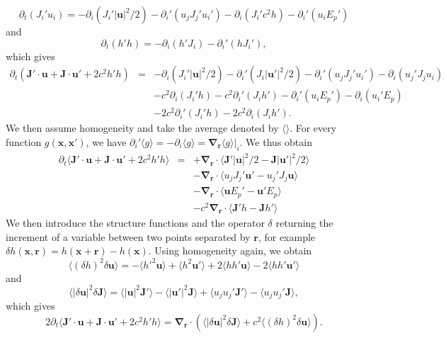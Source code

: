 \documentclass{jfm}
\providecommand\bnabla{\boldsymbol{\nabla}}
\newcommand\p{\ensuremath{\partial}}
\newcommand{\uu}{\textbf{u}}
\newcommand{\xx}{\textbf{x}}
\newcommand{\JJ}{\textbf{J}}
\newcommand{\rr}{\textbf{r}}
\newcommand{\meane}[1]{\langle #1 \rangle}
\begin{document}
\begin{equation}
\p_t ( J_i' u_i ) = - \p_i( J_i'|\uu|^2/2) - \p_i'(u_j J_j' u_i')
-\p_i (J_i' c^2 h)  - \p_i' (u_i E_p')
\end{equation}
and
\begin{equation}
\p_t ( h' h ) = - \p_i( h'J_i ) - \p_i'( hJ_i' ),
\end{equation}
which gives
\begin{eqnarray}
\p_t ( \JJ'\cdot\uu + \JJ\cdot\uu' + 2c^2 h'h )
&=& - \p_i( J_i'|\uu|^2/2) - \p_i'( J_i|\uu'|^2/2) %
- \p_i'(u_j J_j' u_i') - \p_i(u_j' J_j u_i) \nonumber\\
&& -c^2\p_i (J_i'h) - c^2\p_i' (J_ih') %
- \p_i' (u_i E_p') - \p_i (u_i' E_p) \nonumber\\
&& -2c^2\p_i' (J_i'h) - 2c^2\p_i (J_ih').
\end{eqnarray}
We then assume homogeneity and take the average denoted by
$\meane{}$.   For
every function $g(\xx, \xx')$, we have $\p_i' \meane{g} =
-\p_i\meane{g} = \bnabla_{\rr} \meane{g}|_i$. We thus obtain
\begin{eqnarray}
\p_t \meane{ \JJ'\cdot\uu + \JJ\cdot\uu' + 2c^2 h'h }
&=& + \bnabla_{\rr}\cdot\meane{ \JJ'|\uu|^2/2 - \JJ|\uu'|^2/2 } \nonumber\\
&& - \bnabla_{\rr}\cdot\meane{ u_j J_j' \uu' - u_j' J_j \uu } \nonumber\\
&& - \bnabla_{\rr}\cdot\meane{ \uu E_p'- \uu' E_p } \nonumber\\
&& -c^2\bnabla_{\rr}\cdot\meane{ \JJ'h - \JJ h' }
\end{eqnarray}
%
We then introduce the structure functions and the operator $\delta$
returning the increment of a variable between two points separated by $\rr$, 
for example $\delta h (\xx, \rr) = h(\xx+\rr)- h(\xx)$.
%
Using homogeneity again, we obtain
\begin{equation}
\meane{ (\delta h)^2 \delta\uu } = 
-\meane{ h'^2 \uu } + \meane{ h^2 \uu' }
+2\meane{ hh' \uu } - 2\meane{ hh' \uu' }
\end{equation}
and 
\begin{equation}
\meane{ |\delta \uu|^2 \delta\JJ } = 
\meane{  |\uu|^2 \JJ' } - \meane{ |\uu'|^2\JJ }
+\meane{ u_ju_j' \JJ' } - \meane{  u_ju_j' \JJ },
\end{equation}
which gives
\begin{equation}
2\p_t \meane{ \JJ'\cdot\uu + \JJ\cdot\uu' + 2c^2 h'h }
= \bnabla_{\rr} \cdot ( \meane{ |\delta \uu|^2 \delta\JJ } 
+ c^2\meane{ (\delta h)^2 \delta\uu } ).
\end{equation}
\end{document}
